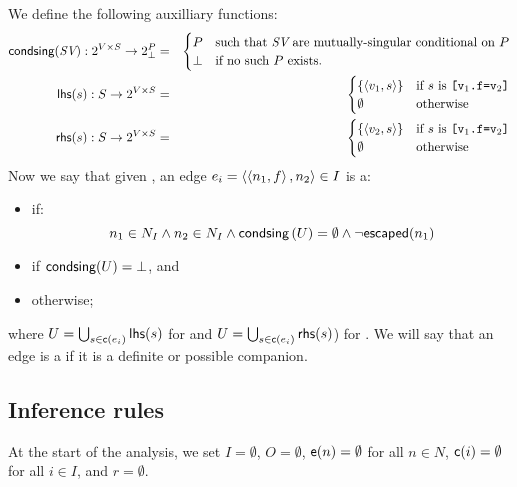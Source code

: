\documentclass[11pt,notitlepage]{article}
\newcommand{\bigvar}[1]{\ensuremath{\text{\it #1}}}
\newcommand{\func}[1]{\ensuremath{\text{\sffamily #1}}}
\begin{document}
We define the following auxilliary functions:
\begin{eqnarray*}
\func{condsing}(\bigvar{SV}):2^{V\times S}\to 2^P_\bot &=& \begin{cases}
P&\text{such that }\bigvar{SV}\text{ are mutually-singular conditional on }P \\
\bot & \text{if no such }P\text{ exists.}
\end{cases}
\\
\func{lhs}(s):S\to 2^{V\times S} &=& \begin{cases}
\left\{\tuple{v_1,s}\right\} &\text{if $s$ is \tt [v$_1$.f=v$_2$]}\\
\emptyset & \text{otherwise}
\end{cases}
\\
\func{rhs}(s):S\to 2^{V\times S} &=& \begin{cases}
\left\{\tuple{v_2,s}\right\} &\text{if $s$ is \tt [v$_1$.f=v$_2$]}\\
\emptyset & \text{otherwise}
\end{cases}
\end{eqnarray*}
Now we say that given \tuple{O,I,\func{e},\func{c},r},
an edge $e_i=\left\langle \left\langle n_1,f \right\rangle,n_2 \right\rangle \in I$ is a:
\begin{itemize}
\item {} if:
\[
 n_1\in N_I \wedge n_2\in N_I \wedge
 \func{condsing}\left(U\right)=\emptyset \wedge
 \neg\func{escaped}(n_1)
\]
\item {} if \(
 \func{condsing}(U) = \bot
\), and
\item {} otherwise;
\end{itemize}
where 
$U=\bigcup_{s\in\func{c}(e_i)} \func{lhs}(s)$ for  and
$U=\bigcup_{s\in\func{c}(e_i)} \func{rhs}(s)$) for .
We will say that an edge is a  if it is a
definite or possible companion.

\subsection{Inference rules}
At the start of the analysis, we set $I=\emptyset$, $O=\emptyset$,
$\func{e}(n)=\emptyset$ for all $n\in N$, $\func{c}(i)=\emptyset$ for all $i\in I$,
and $r=\emptyset$.
\end{document}
